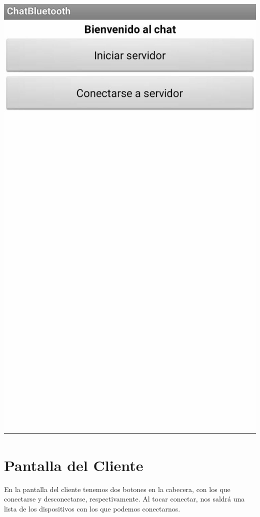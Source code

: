 \documentclass{article}
\begin{document}
\begin{flushleft}
	\includegraphics[scale=0.3]{imagenes/Screen1.jpg} 
\end{flushleft}

\section{Pantalla del Cliente}

En la pantalla del cliente tenemos dos botones en la cabecera, con los que conectarse y desconectarse, respectivamente. Al tocar conectar, nos saldrá una lista de los dispositivos con los que podemos conectarnos.
\end{document}
